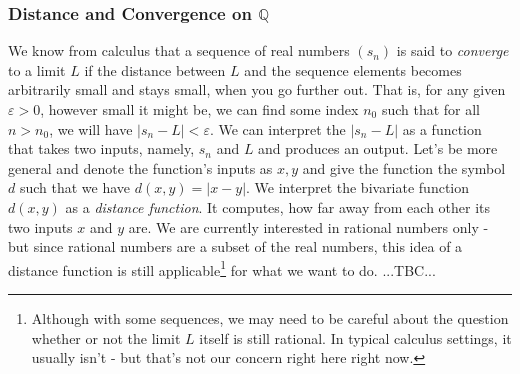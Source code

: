 %





\subsubsection{Distance and Convergence on $\mathbb{Q}$}
We know from calculus that a sequence of real numbers $(s_n)$ is said to \emph{converge} to a limit $L$ if the distance between $L$ and the sequence elements becomes arbitrarily small and stays small, when you go further out. That is, for any given $\varepsilon > 0$, however small it might be, we can find some index $n_0$ such that for all $n > n_0$, we will have $|s_n - L| < \varepsilon$. We can interpret the $|s_n - L|$ as a function that takes two inputs, namely, $s_n$ and $L$ and produces an output. Let's be more general and denote the function's inputs as $x,y$ and give the function the symbol $d$ such that we have $d(x,y) = |x-y|$. We interpret the bivariate function $d(x,y)$ as a \emph{distance function}. It computes, how far away from each other its two inputs $x$ and $y$ are. We are currently interested in rational numbers only - but since rational numbers are a subset of the real numbers, this idea of a distance function is still applicable\footnote{Although with some sequences, we may need to be careful about the question whether or not the limit $L$ itself is still rational. In typical calculus settings, it usually isn't - but that's not our concern right here right now.} for what we want to do. ...TBC...





